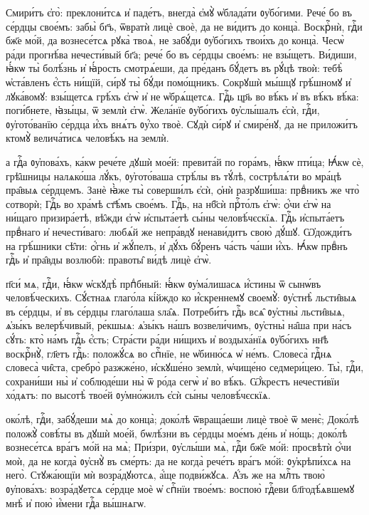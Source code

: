 Смири́тъ є҆го̀: преклони́тсѧ и҆ паде́тъ, внегда̀ є҆мꙋ̀ ѡ҆блада́ти ᲂу҆бо́гими.
Рече́ бо въ се́рдцы свое́мъ: забы̀ бг҃ъ, ѿвратѝ лицѐ своѐ, да не ви́дитъ до конца̀.
Воскрⷭ҇нѝ, гдⷭ҇и бж҃е мо́й, да вознесе́тсѧ рꙋка̀ твоѧ̀, не забꙋ́ди ᲂу҆бо́гихъ твои́хъ до конца̀.
Чесѡ̀ ра́ди прогнѣ́ва нечести́вый бг҃а; рече́ бо въ се́рдцы свое́мъ: не взы́щетъ.
Ви́диши, ꙗ҆́кѡ ты̀ болѣ́знь и҆ ꙗ҆́рость смотрѧ́еши, да пре́данъ бꙋ́детъ въ рꙋ́цѣ твоѝ: тебѣ̀ ѡ҆ста́вленъ є҆́сть ни́щїй, си́рꙋ ты̀ бꙋ́ди помо́щникъ.
Сокрꙋшѝ мы́шцꙋ грѣ́шномꙋ и҆ лꙋка́вомꙋ: взы́щетсѧ грѣ́хъ є҆гѡ̀ и҆ не ѡ҆брѧ́щетсѧ.
Гдⷭ҇ь цр҃ь во вѣ́къ и҆ въ вѣ́къ вѣ́ка: поги́бнете, ꙗ҆зы́цы, ѿ землѝ є҆гѡ̀.
Жела́нїе ᲂу҆бо́гихъ ᲂу҆слы́шалъ є҆сѝ, гдⷭ҇и, ᲂу҆гото́ванїю се́рдца и҆́хъ внѧ́тъ ᲂу҆́хо твоѐ.
Сꙋдѝ си́рꙋ и҆ смире́нꙋ, да не приложи́тъ ктомꙋ̀ велича́тисѧ человѣ́къ на землѝ.


\vskip8pt
а гдⷭ҇а ᲂу҆пова́хъ, ка́кѡ рече́те дꙋшѝ мое́й: превита́й по гора́мъ, ꙗ҆́кѡ пти́ца;
Ꙗ҆́кѡ сѐ, грѣ̑шницы налѧко́ша лꙋ́къ, ᲂу҆гото́ваша стрѣ́лы въ тꙋ́лѣ, сострѣлѧ́ти во мра́цѣ пра̑выѧ се́рдцемъ.
Занѐ ꙗ҆̀же ты̀ соверши́лъ є҆сѝ, ѻ҆нѝ разрꙋши́ша: првⷣникъ же что̀ сотворѝ;
Гдⷭ҇ь во хра́мѣ ст҃ѣ́мъ свое́мъ. Гдⷭ҇ь, на нб҃сѝ прⷭ҇то́лъ є҆гѡ̀: ѻ҆́чи є҆гѡ̀ на ни́щаго призира́етѣ, вѣ̑жди є҆гѡ̀ и҆спыта́етѣ сы́ны человѣ́чєскїѧ.
Гдⷭ҇ь и҆спыта́етъ првⷣнаго и҆ нечести́ваго: любѧ́й же непра́вдꙋ ненави́дитъ свою̀ дꙋ́шꙋ.
Ѡ҆дожди́тъ на грѣ́шники сѣ̑ти: ѻ҆́гнь и҆ жꙋ́пелъ, и҆ дꙋ́хъ бꙋ́ренъ ча́сть ча́ши и҆́хъ.
Ꙗ҆́кѡ првⷣнъ гдⷭ҇ь и҆ пра̑вды возлюбѝ: правоты̑ ви́дѣ лицѐ є҆гѡ̀.


%
п҃си́ мѧ, гдⷭ҇и, ꙗ҆́кѡ ѡ҆скꙋдѣ̀ прпⷣбный: ꙗ҆́кѡ ᲂу҆ма́лишасѧ и҆́стины ѿ сынѡ́въ человѣ́ческихъ.
Сꙋ́єтнаѧ глаго́ла кі́йждо ко и҆́скреннемꙋ своемꙋ̀: ᲂу҆стнѣ̀ льсти̑выѧ въ се́рдцы, и҆ въ се́рдцы глаго́лаша ѕла̑ѧ.
Потреби́тъ гдⷭ҇ь всѧ̑ ᲂу҆стны̀ льсти̑выѧ, ѧ҆зы́къ велерѣ́чивый,
ре́кшыѧ: ѧ҆зы́къ на́шъ возвели́чимъ, ᲂу҆стны̀ на̑ша при на́съ сꙋ́ть: кто̀ на́мъ гдⷭ҇ь є҆́сть;
Стра́сти ра́ди ни́щихъ и҆ воздыха́нїѧ ᲂу҆бо́гихъ нн҃ѣ воскрⷭ҇нꙋ̀, гл҃етъ гдⷭ҇ь: положꙋ́сѧ во спⷭ҇нїе, не ѡ҆биню́сѧ ѡ҆ не́мъ.
Словеса̀ гдⷭ҇нѧ словеса̀ чи̑ста, сребро̀ разжже́но, и҆скꙋше́но землѝ, ѡ҆чище́но седмери́цею.
Ты̀, гдⷭ҇и, сохрани́ши ны̀ и҆ соблюде́ши ны̀ ѿ ро́да сегѡ̀ и҆ во вѣ́къ.
Ѡ҆́крестъ нечести́вїи хо́дѧтъ: по высотѣ̀ твое́й ᲂу҆мно́жилъ є҆сѝ сы́ны человѣ́чєскїѧ.


%
око́лѣ, гдⷭ҇и, забꙋ́деши мѧ̀ до конца̀; доко́лѣ ѿвраща́еши лицѐ твоѐ ѿ менє̀;
Доко́лѣ положꙋ̀ совѣ́ты въ дꙋшѝ мое́й, бѡлѣ́зни въ се́рдцы мое́мъ де́нь и҆ но́щь; доко́лѣ вознесе́тсѧ вра́гъ мо́й на мѧ̀;
При́зри, ᲂу҆слы́ши мѧ̀, гдⷭ҇и бж҃е мо́й: просвѣтѝ ѻ҆́чи моѝ, да не когда̀ ᲂу҆снꙋ̀ въ сме́рть:
да не когда̀ рече́тъ вра́гъ мо́й: ᲂу҆крѣпи́хсѧ на него̀.
Стꙋжа́ющїи мѝ возра́дꙋютсѧ, а҆́ще подви́жꙋсѧ.
А҆́зъ же на млⷭ҇ть твою̀ ᲂу҆пова́хъ: возра́дꙋетсѧ се́рдце моѐ ѡ҆ спⷭ҇нїи твое́мъ: воспою̀ гдⷭ҇еви бл҃годѣ́ѧвшемꙋ мнѣ̀ и҆ пою̀ и҆́мени гдⷭ҇а вы́шнѧгѡ.

\Todo
